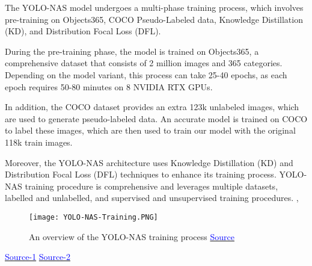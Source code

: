 The YOLO-NAS model undergoes a multi-phase training process, which involves pre-training on Objects365, COCO Pseudo-Labeled data, Knowledge Distillation (KD), and Distribution Focal Loss (DFL).

During the pre-training phase, the model is trained on Objects365, a comprehensive dataset that consists of 2 million images and 365 categories. Depending on the model variant, this process can take 25-40 epochs, as each epoch requires 50-80 minutes on 8 NVIDIA RTX GPUs. 

In addition, the COCO dataset provides an extra 123k unlabeled images, which are used to generate pseudo-labeled data. An accurate model is trained on COCO to label these images, which are then used to train our model with the original 118k train images.

Moreover, the YOLO-NAS architecture uses Knowledge Distillation (KD) and Distribution Focal Loss (DFL) techniques to enhance its training process.
YOLO-NAS training procedure is comprehensive and leverages multiple datasets, labelled and unlabelled, and supervised and unsupervised training procedures. \cite{YOLO-NAS}, \cite{terven2023comprehensive}
\begin{figure}[H]
    \centering
    \texttt{[image: YOLO-NAS-Training.PNG]}
    \caption{An overview of the YOLO-NAS training process \cite{richmond_yolo-nas} \href{https://richmondalake.medium.com/yolo-nas-uncovered-essential-insights-and-implementation-techniques-for-machine-learning-engineers-87ee266b37f6}{\textcolor{blue}{Source}}}
    \label{fig:enter-label}
\end{figure}
\href{https://deci.ai/blog/yolo-nas-object-detection-foundation-model/}{\textcolor{blue}{Source-1}}
\href{https://deci.ai/model-zoo/yolo-nas/}{\textcolor{blue}{Source-2}}  



